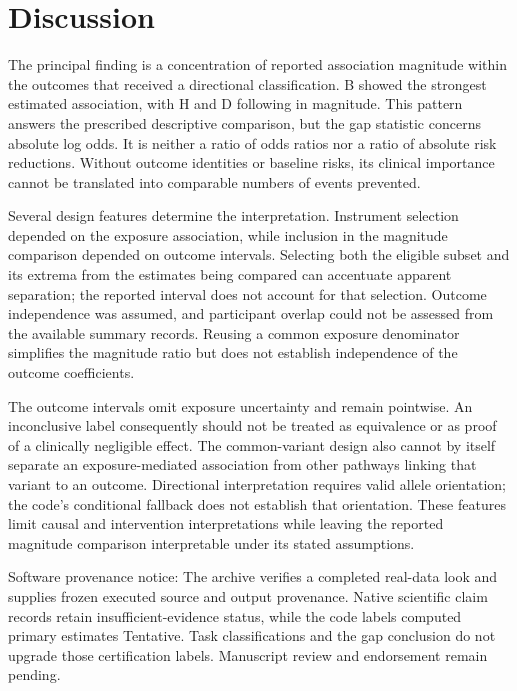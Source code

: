 \documentclass[10pt,a4paper]{article}
\begin{document}
\section*{Discussion}
The principal finding is a concentration of reported association magnitude within the outcomes that received a directional classification. B showed the strongest estimated association, with H and D following in magnitude. This pattern answers the prescribed descriptive comparison, but the gap statistic concerns absolute log odds. It is neither a ratio of odds ratios nor a ratio of absolute risk reductions. Without outcome identities or baseline risks, its clinical importance cannot be translated into comparable numbers of events prevented.
\par
Several design features determine the interpretation. Instrument selection depended on the exposure association, while inclusion in the magnitude comparison depended on outcome intervals. Selecting both the eligible subset and its extrema from the estimates being compared can accentuate apparent separation; the reported interval does not account for that selection. Outcome independence was assumed, and participant overlap could not be assessed from the available summary records. Reusing a common exposure denominator simplifies the magnitude ratio but does not establish independence of the outcome coefficients.
\par
The outcome intervals omit exposure uncertainty and remain pointwise. An inconclusive label consequently should not be treated as equivalence or as proof of a clinically negligible effect. The common-variant design also cannot by itself separate an exposure-mediated association from other pathways linking that variant to an outcome. Directional interpretation requires valid allele orientation; the code's conditional fallback does not establish that orientation. These features limit causal and intervention interpretations while leaving the reported magnitude comparison interpretable under its stated assumptions.
\par
Software provenance notice: The archive verifies a completed real-data look and supplies frozen executed source and output provenance. Native scientific claim records retain insufficient-evidence status, while the code labels computed primary estimates Tentative. Task classifications and the gap conclusion do not upgrade those certification labels. Manuscript review and endorsement remain pending.
\par
\end{document}
